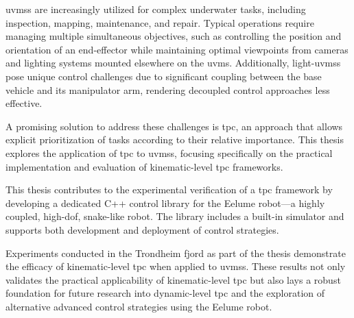 \Glspl{uvms} are increasingly utilized for complex underwater tasks, including inspection, mapping, maintenance, and repair.
Typical operations require managing multiple simultaneous objectives, such as controlling the position and orientation of an end-effector while maintaining optimal viewpoints from cameras and lighting systems mounted elsewhere on the \gls{uvms}.
Additionally, light-\glspl{uvms} pose unique control challenges due to significant coupling between the base vehicle and its manipulator arm, rendering decoupled control approaches less effective.

A promising solution to address these challenges is \gls{tpc}, an approach that allows explicit prioritization of tasks according to their relative importance. This thesis explores the application of \gls{tpc} to \glspl{uvms}, focusing specifically on the practical implementation and evaluation of kinematic-level \gls{tpc} frameworks.

This thesis contributes to the experimental verification of a \gls{tpc} framework by developing a dedicated C++ control library for the Eelume robot—a highly coupled, high-\gls{dof}, snake-like robot. The library includes a built-in simulator and supports both development and deployment of control strategies.

Experiments conducted in the Trondheim fjord as part of the thesis demonstrate the efficacy of kinematic-level \gls{tpc} when applied to \glspl{uvms}.
These results not only validates the practical applicability of kinematic-level \gls{tpc} but also lays a robust foundation for future research into dynamic-level \gls{tpc} and the exploration of alternative advanced control strategies using the Eelume robot.

